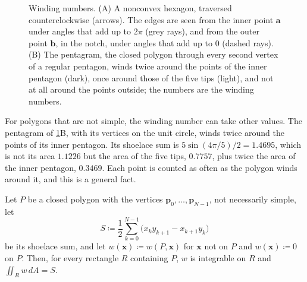 \begin{figure}
{}
\caption{Winding numbers. (A) A nonconvex hexagon, traversed counterclockwise (arrows). The edges are seen from the inner point $\mathbf a$ under angles that add up to $2\pi$ (grey rays), and from the outer point $\mathbf b$, in the notch, under angles that add up to $0$ (dashed rays). (B) The pentagram, the closed polygon through every second vertex of a regular pentagon, winds twice around the points of the inner pentagon (dark), once around those of the five tips (light), and not at all around the points outside; the numbers are the winding numbers.}
\label{fig:winding}
\end{figure}

For polygons that are not simple, the winding number can take other values. The pentagram of \cref{fig:winding}B, with its vertices on the unit circle, winds twice around the points of its inner pentagon. Its shoelace sum is $5\sin(4\pi/5)/2=1.4695$, which is not its area $1.1226$ but the area of the five tips, $0.7757$, plus twice the area of the inner pentagon, $0.3469$. Each point is counted as often as the polygon winds around it, and this is a general fact.

\begin{proposition}
\label{prop:shoelace-winding}
Let $P$ be a closed polygon with the vertices $\mathbf p_0,\ldots,\mathbf p_{N-1}$, not necessarily simple, let
\[
S\coloneqq\frac12\sum_{k=0}^{N-1}\bigl(x_ky_{k+1}-x_{k+1}y_k\bigr)
\]
be its shoelace sum, and let $w(\mathbf x)\coloneqq w(P,\mathbf x)$ for $\mathbf x$ not on $P$ and $w(\mathbf x)\coloneqq0$ on $P$. Then, for every rectangle $R$ containing $P$, $w$ is integrable on $R$ and $\iint_Rw\,dA=S$.
\end{proposition}

